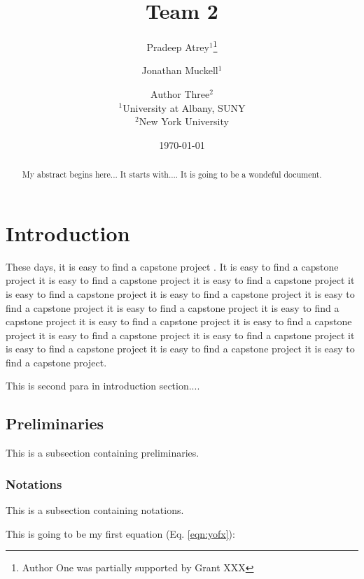 \documentclass[11pt]{article}
\date{
\today
}
\theoremstyle{plain}
\theoremstyle{definition}
\begin{document}
\title{Team 2}
\author{Pradeep Atrey$^1$\thanks{Author One was partially supported by Grant XXX} \and Jonathan Muckell$^1$ \and Author Three$^2$\\
$^1$University at Albany, SUNY\\
$^2$New York University}
	\maketitle
	
\begin{abstract}
My abstract begins here... It starts with.... It is going to be a wondeful document.
		
\end{abstract}


\section{Introduction}
\label{sec:intro}
These days, it is easy to find a capstone project \cite{Atrey2021BrickHouseSecuity}. It is easy to find a capstone project it is easy to find a capstone project it is easy to find a capstone project it is easy to find a capstone project it is easy to find a capstone project it is easy to find a capstone project it is easy to find a capstone project it is easy to find a capstone project it is easy to find a capstone project it is easy to find a capstone project it is easy to find a capstone project it is easy to find a capstone project it is easy to find a capstone project it is easy to find a capstone project it is easy to find a capstone project.

This is second para in introduction section....

\subsection{Preliminaries}\label{sec:prelim}
This is a subsection containing preliminaries.

\subsubsection{Notations}\label{sec:notations}
This is a subsection containing notations.

This is going to be my first equation (Eq. \ref{eqn:yofx}):
	
\end{document}
